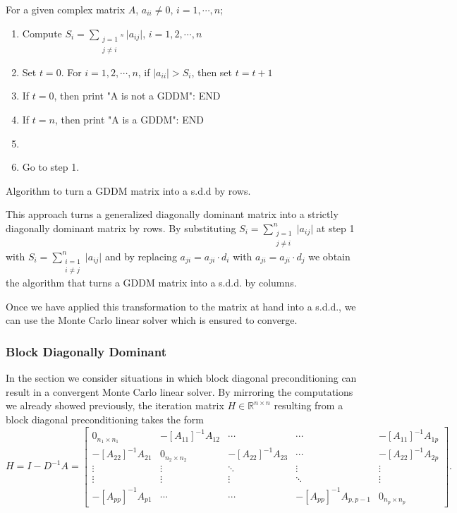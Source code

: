 \begin{algorithm}[H]
 For a given complex matrix $A$, $a_{ii}\ne 0$, $i=1,\cdots, n$;\newline
 \begin{enumerate}
  \item Compute $S_{i}=\sum_{\substack{j=1 \\ j\ne i}^{n}}\lvert
a_{ij}\rvert$,
$i=1,2,\cdots,n$
\item Set $t=0$. For $i=1,2,\cdots, n$, if $\lvert a_{ii}\rvert>S_i$, then set
$t=t+1$
\item If $t=0$, then print "A is not a GDDM": END
\item If $t=n$, then print "A is a GDDM": END
\item {}
\item Go to step 1.
 \end{enumerate}
 \caption{Algorithm to turn a GDDM matrix into a s.d.d by rows.}
\end{algorithm}

This approach turns a generalized diagonally dominant matrix into a
strictly diagonally dominant matrix by rows. By substituting
$\displaystyle S_{i}=\sum^{n}_{\substack{j=1 \\ j\ne i}}\lvert a_{ij}\rvert$
at step 1 with
$\displaystyle S_{i}=\sum^{n}_{\substack{i=1 \\ i\ne j}}\lvert a_{ij}\rvert$
and by replacing
$a_{ji}=a_{ji}\cdot d_i$ with $a_{ji}=a_{ji}\cdot d_j$ we obtain the algorithm
that turns a GDDM matrix into a s.d.d. by columns.

Once we have applied this transformation to the matrix at hand into a s.d.d.,
we can use the Monte Carlo linear solver which is ensured to converge.

\subsubsection{Block Diagonally Dominant}
\label{sec:bdd}

In the section we consider situations in which block diagonal preconditioning
can result in a convergent Monte Carlo linear solver.
By mirroring the computations we already showed previously, the iteration
matrix $H\in\mathbb{R}^{n\times n}$ resulting from a block diagonal
preconditioning takes the form
\[
 H=I-D^{-1}A=\begin{bmatrix}0_{n_1\times n_1} & -[A_{11}]^{-1}A_{12} & \cdots &
\cdots & -[A_{11}]^{-1}A_{1p} \\
-[A_{22}]^{-1}A_{21} & 0_{n_2\times n_2} & -[A_{22}]^{-1}A_{23} &
\cdots & -[A_{22}]^{-1}A_{2p}\\
\vdots & \vdots & \ddots & \vdots & \vdots\\
\vdots & \vdots & \vdots &\ddots & \vdots \\
-[A_{pp}]^{-1}A_{p1} &  \cdots & \cdots&
-[A_{pp}]^{-1}A_{p,p-1} & 0_{n_p \times n_p}
\end{bmatrix}.
\]


